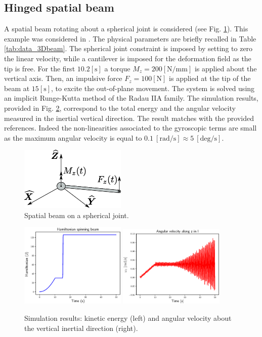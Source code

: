 \documentclass{svjour3}                     %
\begin{document}
\subsection{Hinged spatial beam}
A spatial beam rotating about a spherical joint is considered (see Fig. \ref{fig:beam_3D}). This example was considered in \cite{Cardona2000,Ellenbroek2018}. The physical parameters are briefly recalled in Table \ref{tab:data_3Dbeam}. The spherical joint constraint is imposed by setting to zero the linear velocity, while a cantilever is imposed for the deformation field as the tip is free. For the first $10.2 [\mathrm{s}]$ a torque $ M_z =200 [\mathrm{N/mm}]$ is applied about the vertical axis. Then, an impulsive force $ F_z =100 [\mathrm{N}]$ is applied at the tip of the beam at $15 [\mathrm{s}]$, to excite the out-of-plane movement. The system is solved using an implicit Runge-Kutta method of the Radau IIA family. The simulation results, provided in Fig. \ref{fig:H_omega}, correspond to the total energy and the angular velocity measured in the inertial vertical direction. The result matches with the provided references. Indeed the non-linearities associated to the gyroscopic terms are small as the maximum angular velocity is equal to $0.1 \ [\mathrm{rad/s}] \approx 5 \ [\mathrm{deg/s}]$. 

\begin{figure}[tb]
	\centering
	\includegraphics[width=0.45\textwidth]{rotbeam_3D.eps} 
	\caption{Spatial beam on a spherical joint.}
	\label{fig:beam_3D}
\end{figure}

\begin{figure}[tb]
	\centering
	\includegraphics[width=0.45\textwidth]{H_3Dbeam.eps} 
	\includegraphics[width=0.45\textwidth]{omega_zI.eps} 
	\caption{Simulation results: kinetic energy (left) and angular velocity about the vertical inertial direction (right).}
	\label{fig:H_omega}
\end{figure}
\end{document}
